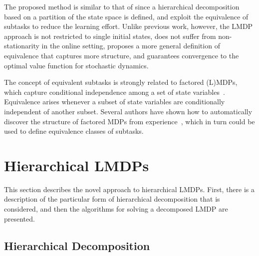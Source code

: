 
The proposed method is similar to that of \citet{Wen2020} since a hierarchical decomposition based on a partition of the state space is defined, and exploit the equivalence of subtasks to reduce the learning effort. Unlike previous work, however, the LMDP approach is not restricted to single initial states, does not suffer from non-stationarity in the online setting, proposes a more general definition of equivalence that captures more structure, and guarantees convergence to the optimal value function for stochastic dynamics.

The concept of equivalent subtasks is strongly related to factored (L)MDPs, which capture conditional independence among a set of state variables~\citep{Boutilier1995, Koller2000}. Equivalence arises whenever a subset of state variables are conditionally independent of another subset. Several authors have shown how to automatically discover the structure of factored MDPs from experience~\citep{Strehl2007,Kolobov2012}, which in turn could be used to define equivalence classes of subtasks.


\section{Hierarchical LMDPs}

This section describes the novel approach to hierarchical LMDPs. First, there is a description of the particular form of hierarchical decomposition that is considered, and then the algorithms for solving a decomposed LMDP are presented.

\subsection{Hierarchical Decomposition}

